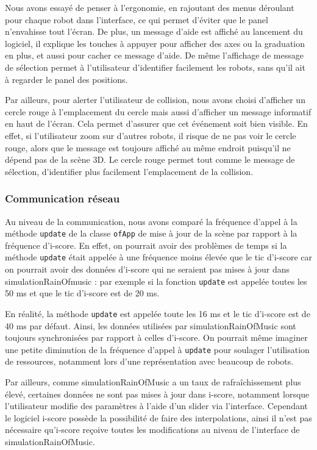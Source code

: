 Nous avons essayé de penser à l'ergonomie, en rajoutant des menus déroulant pour chaque robot dans l'interface, ce qui permet d'éviter que le panel n'envahisse tout l'écran. De plus, un message d'aide est affiché au lancement du logiciel, il explique les touches à appuyer pour afficher des axes ou la graduation en plus, et aussi pour cacher ce message d'aide.
De même l'affichage de message de sélection permet à l'utilisateur d'identifier facilement les robots, sans qu'il ait à regarder le panel des positions.

Par ailleurs, pour alerter l'utilisateur de collision, nous avons choisi d'afficher un cercle rouge à l'emplacement du cercle mais aussi d'afficher un message informatif en haut de l'écran. Cela permet d'assurer que cet événement soit bien visible. En effet, si l'utilisateur zoom sur d'autres robots, il risque de ne pas voir le cercle rouge, alors que le message est toujours affiché au même endroit puisqu'il ne dépend pas de la scène 3D. Le cercle rouge permet tout comme le message de sélection, d'identifier plus facilement l'emplacement de la collision.

\subsubsection{Communication réseau}

Au niveau de la communication, nous avons comparé la fréquence d'appel à la méthode \verb|update| de la classe \verb|ofApp| de mise à jour de la scène par rapport à la fréquence d'i-score. En effet, on pourrait avoir des problèmes de temps si la méthode \verb|update| était appelée à une fréquence moins élevée que le tic d'i-score car on pourrait avoir des données d'i-score qui ne seraient pas mises à jour dans simulationRainOfmusic : par exemple si la fonction \verb|update| est appelée toutes les 50 ms et que le tic d'i-score est de 20 ms. 

En réalité, la méthode \verb|update| est appelée toute les 16 ms et le tic d'i-score est de 40 ms par défaut. Ainsi, les données utilisées par simulationRainOfMusic sont toujours synchronisées par rapport à celles d'i-score. On pourrait même imaginer une petite diminution de la fréquence d'appel à \verb|update| pour soulager l'utilisation de ressources, notamment lors d'une représentation avec beaucoup de robots. 

Par ailleurs, comme simulationRainOfMusic a un taux de rafraîchissement plus élevé, certaines données ne sont pas mises à jour dans i-score, notamment lorsque l'utilisateur modifie des paramètres à l'aide d'un slider via l'interface. Cependant le logiciel i-score possède la possibilité de faire des interpolations, ainsi il n'est pas nécessaire qu'i-score reçoive toutes les modifications au niveau de l'interface de simulationRainOfMusic. 

